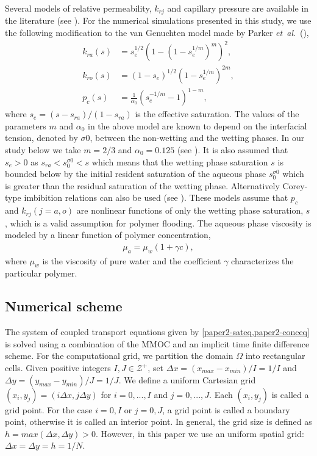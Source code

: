\documentclass[11pt]{article}
\newcommand{\etal}{{\it et~al}.\ }
\begin{document}
Several models of relative permeability, $k_{rj}$ and capillary pressure are available in the literature (see \cite{C1986,vG1980}). 
For the numerical simulations presented in this study, we use the following modification to the van Genuchten model made by Parker \etal (\cite{PLK1987}),
\begin{subequations}
\begin{align}
 k_{ra}(s)&= s_e^{1/2}\left(1-(1-s_e^{1/m})^m\right)^2,\label{paper2-eq:relperm1}\\
 k_{ro}(s)&= (1-s_e)^{1/2}\left(1-s_e^{1/m}\right)^{2m},\label{paper2-eq:relperm2}\\
 p_c(s)&= \frac{1}{\alpha_0}\left(s_e^{-1/m}-1 \right)^{1-m} \label{paper2-eq:cap},
\end{align}
\end{subequations}
where $s_e = (s-s_{ra})/(1-s_{ra})$ is the effective saturation. The values of the parameters $m$ and $\alpha_0$ in the above model are known to depend on the interfacial tension, denoted by $\sigma0$, between the non-wetting and the wetting phases. In our study below we take $m=2/3$ and $\alpha_0 = 0.125$ (see \cite{GLGV2010}). It is also assumed that $s_e>0$ as $s_{ra} < s_0^{\sigma0} < s$ which means that the wetting phase saturation $s$ is bounded below by the initial resident saturation of the aqueous phase $s_0^{\sigma0}$ which is greater than the residual saturation of the wetting phase. Alternatively Corey-type imbibition relations can also be used (see \cite{C1986}). These models assume that $p_c$ and $k_{rj} (j=a,o)$ are nonlinear functions of only the wetting phase saturation, $s$, which is a valid assumption for polymer flooding. The aqueous phase viscosity is modeled by a linear function of polymer concentration,
\begin{align}\label{paper2-eq:vis}
    \mu_a = \mu_w(1+ \gamma c),
\end{align}
where $\mu_w$ is the viscosity of pure water and the coefficient $\gamma$ characterizes the particular polymer.
 

\subsection{Numerical scheme}\label{sec:method}
The system of coupled transport equations given by \cref{paper2-sateq,paper2-conceq} is solved using a combination of the MMOC and an implicit time finite difference scheme. For the computational grid, we partition the domain $\Omega$ into rectangular cells. Given positive integers $I,J \in \mathcal{Z}^+$, set $\Delta x = (x_{max}-x_{min})/I = 1/I $ and $\Delta y = (y_{max} - y_{min})/J =1/J$. We define a uniform Cartesian grid ${(x_{i},y_{j})} = {(i\Delta x,j\Delta y)} $ for $i = 0, . . ., I $ and $j = 0, . . ., J$. Each $(x_{i},y_{j})$ is called a grid point. For the case $i = 0, I$ or $j = 0, J$, a grid point is called a boundary point, otherwise it is called an interior point. In general, the grid size is defined as $h = max(\Delta x,\Delta y) > 0$. However, in this paper we use an uniform spatial grid: $\Delta x = \Delta y = h=1/N$. 
\end{document}
